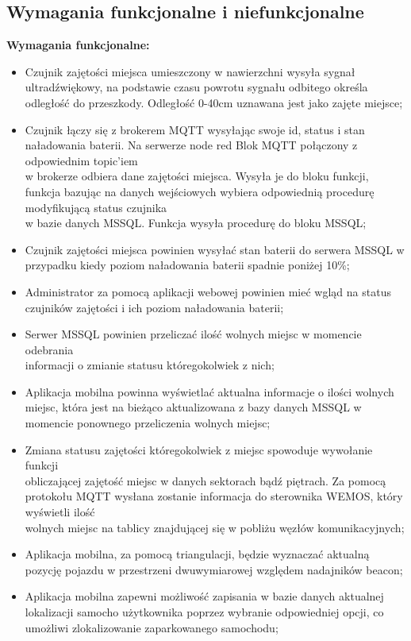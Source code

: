 \documentclass[12pt,a4paper]{article}
\begin{document}
\subsection{Wymagania funkcjonalne i niefunkcjonalne}
{\large \bf Wymagania funkcjonalne:}
\begin{itemize}
\item Czujnik zajętości miejsca umieszczony w nawierzchni wysyła sygnał ultradźwiękowy, na podstawie czasu powrotu sygnału odbitego określa odległość do przeszkody. Odległość 0-40cm uznawana jest jako zajęte miejsce;
\item Czujnik łączy się z brokerem MQTT wysyłając swoje id, status i stan naładowania baterii. Na serwerze node red Blok MQTT połączony z odpowiednim topic’iem\\w  brokerze odbiera dane zajętości miejsca. Wysyła je do bloku funkcji, funkcja bazując na danych wejściowych wybiera odpowiednią procedurę modyfikującą status czujnika\\w bazie danych MSSQL. Funkcja wysyła procedurę do bloku MSSQL;
\item Czujnik zajętości miejsca powinien wysyłać stan baterii do serwera MSSQL w przypadku kiedy poziom naładowania baterii spadnie poniżej 10\%;
\item Administrator za pomocą aplikacji webowej powinien mieć wgląd na status czujników zajętości i ich poziom naładowania baterii;
\item Serwer MSSQL powinien przeliczać ilość wolnych miejsc w momencie odebrania\\informacji o zmianie statusu któregokolwiek z nich;
\item Aplikacja mobilna powinna wyświetlać aktualna informacje o ilości wolnych miejsc, która jest na bieżąco aktualizowana z bazy danych MSSQL w momencie ponownego przeliczenia wolnych miejsc;
\item Zmiana statusu zajętości któregokolwiek z miejsc spowoduje wywołanie funkcji\\obliczającej zajętość miejsc w danych sektorach bądź piętrach. Za pomocą protokołu MQTT wysłana zostanie informacja do sterownika WEMOS, który wyświetli ilość\\wolnych miejsc na tablicy znajdującej się w pobliżu węzłów komunikacyjnych;
\item Aplikacja mobilna, za pomocą triangulacji, będzie wyznaczać aktualną pozycję pojazdu w przestrzeni dwuwymiarowej względem nadajników beacon;
\item Aplikacja mobilna zapewni możliwość zapisania w bazie danych aktualnej lokalizacji samocho użytkownika poprzez wybranie odpowiedniej opcji, co umożliwi zlokalizowanie zaparkowanego samochodu;

\end{itemize}
\end{document}
